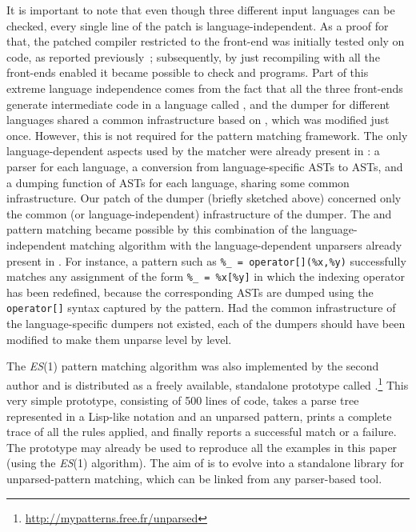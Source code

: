 It is important to note that even though three different input
languages can be checked, every single line of the patch is
language\hyp{}independent. As a proof for that, the patched \GCC
compiler restricted to the \Clang front\hyp{}end was initially tested
only on \Clang code, as reported previously~\cite{ppdp}; subsequently,
by just recompiling \GCC with all the front\hyp{}ends enabled it
became possible to check \cpp{} and \Ada programs. Part of this
extreme language independence comes from the fact that all the three
front\hyp{}ends generate intermediate code in a language called
\Gimple, and the dumper for different languages shared a common
infrastructure based on \Gimple, which was modified just
once. However, this is not required for the pattern matching
framework. The only language\hyp{}dependent aspects used by the
matcher were already present in \GCC: a parser for each language, a
conversion from language\hyp{}specific ASTs to \Gimple ASTs, and a
dumping function of \Gimple ASTs for each language, sharing some
common infrastructure. Our patch of the dumper (briefly sketched
above) concerned only the common (or language\hyp{}independent)
infrastructure of the dumper. The \cpp{} and \Ada pattern matching
became possible by this combination of the language\hyp{}independent
matching algorithm with the language\hyp{}dependent unparsers already
present in \GCC.  For instance, a pattern such as \texttt{\%\_ =
operator[](\%x,\%y)} successfully matches any \cpp{} assignment of the
form \texttt{\%\_ = \%x[\%y]} in which the indexing operator has been
redefined, because the corresponding \Gimple ASTs are dumped using the
\texttt{operator[]} syntax captured by the pattern.  Had the common
infrastructure of the language\hyp{}specific dumpers not existed, each
of the dumpers should have been modified to make them unparse level by
level.

The \textit{ES}(1) pattern matching algorithm was also implemented by
the second author and is distributed as a freely available, standalone
prototype called
\Matchbox.\footnote{\url{http://mypatterns.free.fr/unparsed}} This
very simple prototype, consisting of 500 lines of \Clang code, takes a
parse tree represented in a \textsf{Lisp}\hyp{}like notation and an
unparsed pattern, prints a complete trace of all the rules applied,
and finally reports a successful match or a failure. The prototype may
already be used to reproduce all the examples in this paper (using the
\textit{ES}(1) algorithm). The aim of \Matchbox is to evolve into a
standalone library for unparsed\hyp{}pattern matching, which can be
linked from any parser\hyp{}based tool.


